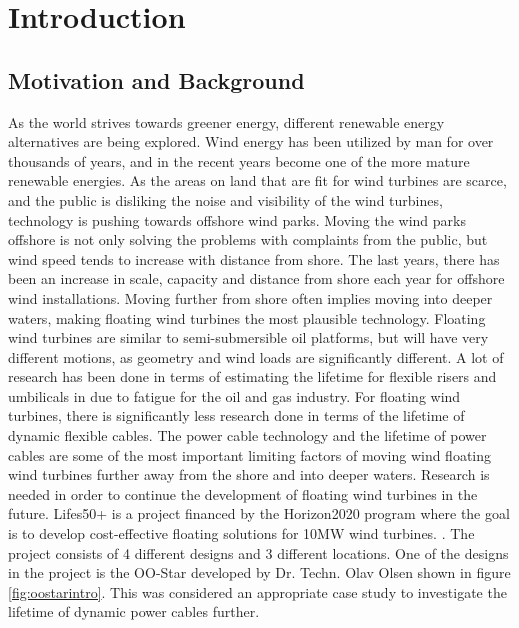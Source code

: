 \chapter{Introduction}
\label{chap:introduction}
\section{Motivation and Background}
As the world strives towards greener energy, different renewable energy alternatives are being explored. Wind energy has been utilized by man for over thousands of years, and in the recent years become one of the more mature renewable energies. As the areas on land that are fit for wind turbines are scarce, and the public is disliking the noise and visibility of the wind turbines, technology is pushing towards offshore wind parks. Moving the wind parks offshore is not only solving the problems with complaints from the public, but wind speed tends to increase with distance from shore. The last years, there has been an increase in scale, capacity and distance from shore each year for offshore wind installations. Moving further from shore often implies moving into deeper waters, making floating wind turbines the most plausible technology. Floating wind turbines are similar to semi-submersible oil platforms, but will have very different motions, as geometry and wind loads are significantly different. A lot of research has been done in terms of estimating the lifetime for flexible risers and umbilicals in due to fatigue for the oil and gas industry. For floating wind turbines, there is significantly less research done in terms of the lifetime of dynamic flexible cables. The power cable technology and the lifetime of power cables are some of the most important limiting factors of moving wind floating wind turbines further away from the shore and into deeper waters. Research is needed in order to continue the development of floating wind turbines in the future. \cite{Thies2012} \newline
\newline
Lifes50+ is a project financed by the Horizon2020 program where the goal is to develop cost-effective floating solutions for 10MW wind turbines. \cite{Horizon2010}. The project consists of 4 different designs and 3 different locations. One of the designs in the project is the OO-Star developed by Dr. Techn. Olav Olsen shown in figure \ref{fig:oostarintro}. This was considered an appropriate case study to investigate the lifetime of dynamic power cables further. 

